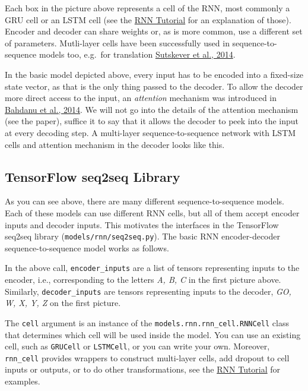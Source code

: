 Each box in the picture above represents a cell of the RNN, most
commonly a GRU cell or an LSTM cell (see the
\href{tensorflow-zh/SOURCE/tutorials/recurrent/index.md}{RNN Tutorial}
for an explanation of those). Encoder and decoder can share weights or,
as is more common, use a different set of parameters. Mutli-layer cells
have been successfully used in sequence-to-sequence models too, e.g.~for
translation \href{http://arxiv.org/abs/1409.3215}{Sutskever et al.,
2014}.

In the basic model depicted above, every input has to be encoded into a
fixed-size state vector, as that is the only thing passed to the
decoder. To allow the decoder more direct access to the input, an
\emph{attention} mechanism was introduced in
\href{http://arxiv.org/abs/1409.0473}{Bahdanu et al., 2014}. We will not
go into the details of the attention mechanism (see the paper), suffice
it to say that it allows the decoder to peek into the input at every
decoding step. A multi-layer sequence-to-sequence network with LSTM
cells and attention mechanism in the decoder looks like this.

\subsection{TensorFlow seq2seq Library
}\label{tensorflow-seq2seq-library}

As you can see above, there are many different sequence-to-sequence
models. Each of these models can use different RNN cells, but all of
them accept encoder inputs and decoder inputs. This motivates the
interfaces in the TensorFlow seq2seq library
(\texttt{models/rnn/seq2seq.py}). The basic RNN encoder-decoder
sequence-to-sequence model works as follows.

\begin{Shaded}
\begin{Highlighting}[]
\OperatorTok{=} 
\end{Highlighting}
\end{Shaded}

In the above call, \texttt{encoder\_inputs} are a list of tensors
representing inputs to the encoder, i.e., corresponding to the letters
\emph{A, B, C} in the first picture above. Similarly,
\texttt{decoder\_inputs} are tensors representing inputs to the decoder,
\emph{GO, W, X, Y, Z} on the first picture.

The \texttt{cell} argument is an instance of the
\texttt{models.rnn.rnn\_cell.RNNCell} class that determines which cell
will be used inside the model. You can use an existing cell, such as
\texttt{GRUCell} or \texttt{LSTMCell}, or you can write your own.
Moreover, \texttt{rnn\_cell} provides wrappers to construct multi-layer
cells, add dropout to cell inputs or outputs, or to do other
transformations, see the
\href{tensorflow-zh/SOURCE/tutorials/recurrent/index.md}{RNN Tutorial}
for examples.

